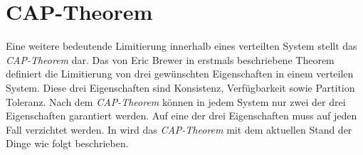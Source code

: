 \section{CAP-Theorem}\label{sec:distributedSystems:capTheorem}
Eine weitere bedeutende Limitierung innerhalb eines verteilten System stellt das \textit{CAP-Theorem}  dar. Das von Eric Brewer in \cite{Brewer2000TowardsSystems}  erstmals beschriebene Theorem definiert die Limitierung von drei gewünschten Eigenschaften in einem verteilen System. Diese drei Eigenschaften sind Konsistenz, Verfügbarkeit sowie Partition Toleranz. Nach dem \textit{CAP-Theorem} können in jedem System nur zwei der drei Eigenschaften garantiert werden. Auf eine der drei Eigenschaften muss auf jeden Fall verzichtet werden. In \cite{gilbertPerspectiveCAPTheorem2012} wird das \textit{CAP-Theorem} mit dem aktuellen Stand der Dinge wie folgt beschrieben.
% 
% 

